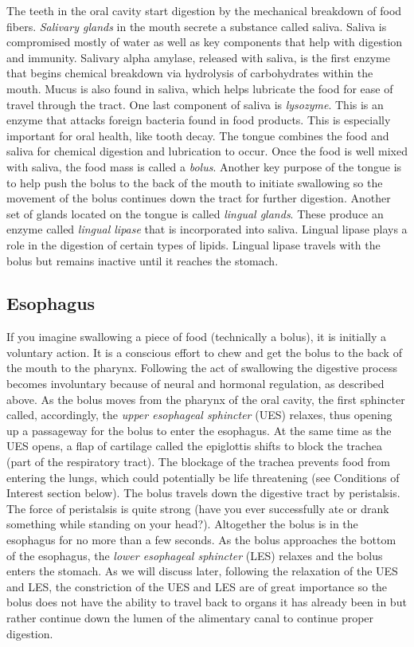 \documentclass{tufte-handout}
\begin{document}
The teeth in the oral cavity start digestion by the mechanical breakdown of food fibers. \emph{Salivary glands} in the mouth secrete a substance called saliva. Saliva is compromised mostly of water as well as key components that help with digestion and immunity. Salivary alpha amylase, released with saliva, is the first enzyme that begins chemical breakdown via hydrolysis of carbohydrates within the mouth. Mucus is also found in saliva, which helps lubricate the food for ease of travel through the tract. One last component of saliva is \emph{lysozyme}. This is an enzyme that attacks foreign bacteria found in food products. This is especially important for oral health, like tooth decay. The tongue combines the food and saliva for chemical digestion and lubrication to occur. Once the food is well mixed with saliva, the food mass is called a \emph{bolus}. Another key purpose of the tongue is to help push the bolus to the back of the mouth to initiate swallowing so the movement of the bolus continues down the tract for further digestion. Another set of glands located on the tongue is called \emph{lingual glands}. These produce an enzyme called \emph{lingual lipase} that is incorporated into saliva. Lingual lipase plays a role in the digestion of certain types of lipids. Lingual lipase travels with the bolus but remains inactive until it reaches the stomach.

\subsection{Esophagus}
If you imagine swallowing a piece of food (technically a bolus), it is initially a voluntary action. It is a conscious effort to chew and get the bolus to the back of the mouth to the pharynx. Following the act of swallowing the digestive process becomes involuntary because of neural and hormonal regulation, as described above. As the bolus moves from the pharynx of the oral cavity, the first sphincter called, accordingly, the \emph{upper esophageal sphincter} (UES) relaxes, thus opening up a passageway for the bolus to enter the esophagus. At the same time as the UES opens, a flap of cartilage called the epiglottis shifts to block the trachea (part of the respiratory tract). The blockage of the trachea prevents food from entering the lungs, which could potentially be life threatening (see Conditions of Interest section below). The bolus travels down the digestive tract by peristalsis. The force of peristalsis is quite strong (have you ever successfully ate or drank something while standing on your head?). Altogether the bolus is in the esophagus for no more than a few seconds. As the bolus approaches the bottom of the esophagus, the \emph{lower esophageal sphincter} (LES) relaxes and the bolus enters the stomach. As we will discuss later, following the relaxation of the UES and LES, the constriction of the UES and LES are of great importance so the bolus does not have the ability to travel back to organs it has already been in but rather continue down the lumen of the alimentary canal to continue proper digestion. 
\end{document}
